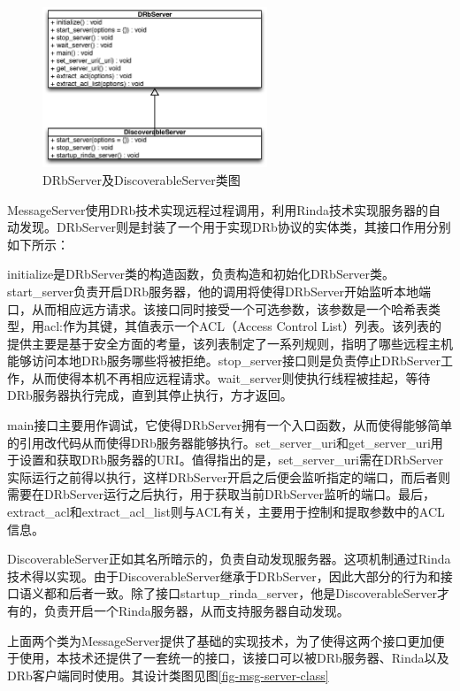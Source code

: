 \begin{figure}[h]
\centering
\includegraphics[width=0.6\textwidth]{images/detail/drbserver_class.eps}
\caption{DRbServer及DiscoverableServer类图}
\label{fig-drb-class}
\end{figure}

MessageServer使用DRb技术实现远程过程调用，利用Rinda技术实现服务器的自动发现。DRbServer则是封装了一个用于实现DRb协议的实体类，其接口作用分别如下所示：

initialize是DRbServer类的构造函数，负责构造和初始化DRbServer类。start\_server负责开启DRb服务器，他的调用将使得DRbServer开始监听本地端口，从而相应远方请求。该接口同时接受一个可选参数，该参数是一个哈希表类型，用acl:作为其键，其值表示一个ACL（Access Control List）列表。该列表的提供主要是基于安全方面的考量，该列表制定了一系列规则，指明了哪些远程主机能够访问本地DRb服务哪些将被拒绝。stop\_server接口则是负责停止DRbServer工作，从而使得本机不再相应远程请求。wait\_server则使执行线程被挂起，等待DRb服务器执行完成，直到其停止执行，方才返回。

main接口主要用作调试，它使得DRbServer拥有一个入口函数，从而使得能够简单的引用改代码从而使得DRb服务器能够执行。set\_server\_uri和get\_server\_uri用于设置和获取DRb服务器的URI。值得指出的是，set\_server\_uri需在DRbServer实际运行之前得以执行，这样DRbServer开启之后便会监听指定的端口，而后者则需要在DRbServer运行之后执行，用于获取当前DRbServer监听的端口。最后，extract\_acl和extract\_acl\_list则与ACL有关，主要用于控制和提取参数中的ACL信息。

DiscoverableServer正如其名所暗示的，负责自动发现服务器。这项机制通过Rinda技术得以实现。由于DiscoverableServer继承于DRbServer，因此大部分的行为和接口语义都和后者一致。除了接口startup\_rinda\_server，他是DiscoverableServer才有的，负责开启一个Rinda服务器，从而支持服务器自动发现。

上面两个类为MessageServer提供了基础的实现技术，为了使得这两个接口更加便于使用，本技术还提供了一套统一的接口，该接口可以被DRb服务器、Rinda以及DRb客户端同时使用。其设计类图见图\ref{fig-msg-server-class}

